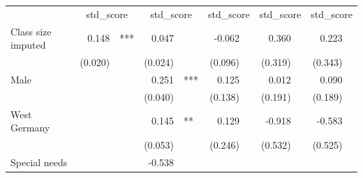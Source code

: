 \documentclass{article}
\begin{document}
\begin{table}[!h]
\centering
\begin{tabular}{lllllllllll}
\cline{1-11}
\multicolumn{1}{r}{} &
  \multicolumn{2}{c}{std\_score} &
  \multicolumn{2}{c}{std\_score} &
  \multicolumn{2}{c}{std\_score} &
  \multicolumn{2}{c}{std\_score} &
  \multicolumn{2}{c}{std\_score} \\
\cline{1-11}
\multicolumn{1}{l}{Class size imputed} &
  \multicolumn{1}{r}{0.148} &
  \multicolumn{1}{l}{***} &
  \multicolumn{1}{r}{0.047} &
  \multicolumn{1}{l}{} &
  \multicolumn{1}{r}{-0.062} &
  \multicolumn{1}{l}{} &
  \multicolumn{1}{r}{0.360} &
  \multicolumn{1}{l}{} &
  \multicolumn{1}{r}{0.223} &
  \multicolumn{1}{l}{} \\
\multicolumn{1}{l}{} &
  \multicolumn{1}{r}{(0.020)} &
  \multicolumn{1}{l}{} &
  \multicolumn{1}{r}{(0.024)} &
  \multicolumn{1}{l}{} &
  \multicolumn{1}{r}{(0.096)} &
  \multicolumn{1}{l}{} &
  \multicolumn{1}{r}{(0.319)} &
  \multicolumn{1}{l}{} &
  \multicolumn{1}{r}{(0.343)} &
  \multicolumn{1}{l}{} \\
\multicolumn{1}{l}{Male} &
  \multicolumn{1}{r}{} &
  \multicolumn{1}{l}{} &
  \multicolumn{1}{r}{0.251} &
  \multicolumn{1}{l}{***} &
  \multicolumn{1}{r}{0.125} &
  \multicolumn{1}{l}{} &
  \multicolumn{1}{r}{0.012} &
  \multicolumn{1}{l}{} &
  \multicolumn{1}{r}{0.090} &
  \multicolumn{1}{l}{} \\
\multicolumn{1}{l}{} &
  \multicolumn{1}{r}{} &
  \multicolumn{1}{l}{} &
  \multicolumn{1}{r}{(0.040)} &
  \multicolumn{1}{l}{} &
  \multicolumn{1}{r}{(0.138)} &
  \multicolumn{1}{l}{} &
  \multicolumn{1}{r}{(0.191)} &
  \multicolumn{1}{l}{} &
  \multicolumn{1}{r}{(0.189)} &
  \multicolumn{1}{l}{} \\
\multicolumn{1}{l}{West Germany} &
  \multicolumn{1}{r}{} &
  \multicolumn{1}{l}{} &
  \multicolumn{1}{r}{0.145} &
  \multicolumn{1}{l}{**} &
  \multicolumn{1}{r}{0.129} &
  \multicolumn{1}{l}{} &
  \multicolumn{1}{r}{-0.918} &
  \multicolumn{1}{l}{} &
  \multicolumn{1}{r}{-0.583} &
  \multicolumn{1}{l}{} \\
\multicolumn{1}{l}{} &
  \multicolumn{1}{r}{} &
  \multicolumn{1}{l}{} &
  \multicolumn{1}{r}{(0.053)} &
  \multicolumn{1}{l}{} &
  \multicolumn{1}{r}{(0.246)} &
  \multicolumn{1}{l}{} &
  \multicolumn{1}{r}{(0.532)} &
  \multicolumn{1}{l}{} &
  \multicolumn{1}{r}{(0.525)} &
  \multicolumn{1}{l}{} \\
\multicolumn{1}{l}{Special needs} &
  \multicolumn{1}{r}{} &
  \multicolumn{1}{l}{} &
  \multicolumn{1}{r}{-0.538} &

\end{tabular}
\end{table}
\end{document}
